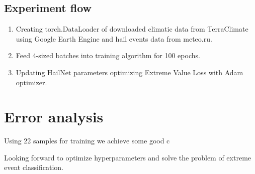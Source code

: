 \documentclass{article}
\begin{document}
\newpage

\subsection{Experiment flow}
\begin{enumerate}
    \item  Creating torch.DataLoader of downloaded climatic data from TerraClimate using Google Earth Engine and hail events data from meteo.ru.
    \item Feed 4-sized batches into training algorithm for 100 epochs.
    \item Updating HailNet parameters optimizing Extreme Value Loss with Adam optimizer.
\end{enumerate}

\section{Error analysis}
Using 22 samples for training we achieve some good c


Looking forward to optimize hyperparameters and solve the problem of extreme event classification.

\end{document}
